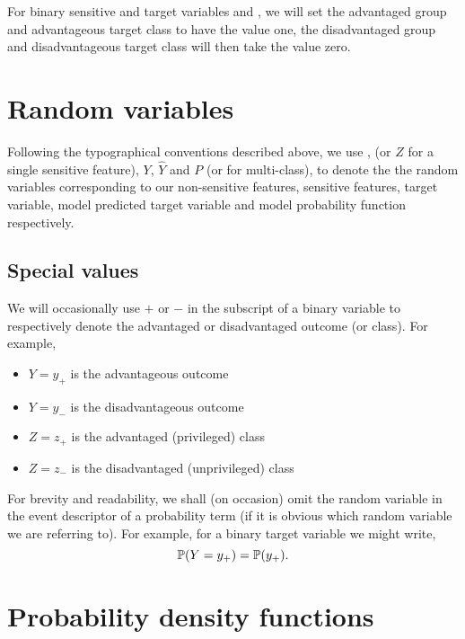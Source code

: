 For binary sensitive and target variables  and , we will set the advantaged group and advantageous target class to have the value one, the disadvantaged group and disadvantageous target class will then take the value zero.

\section*{Random variables}

Following the typographical conventions described above, we use ,  (or $Z$ for a single sensitive feature), $Y$, $\hat{Y}$ and $P$ (or  for multi-class), to denote the the random variables corresponding to our non-sensitive features, sensitive features, target variable, model predicted target variable and model probability function respectively.

\subsection*{Special values}

We will occasionally use $+$ or $-$ in the subscript of a binary variable to respectively denote the advantaged or disadvantaged outcome (or class). For example,
\begin{itemize}
\item $Y = y_+$ is the advantageous outcome
\item $Y = y_-$ is the disadvantageous outcome
\item $Z = z_+$ is the advantaged (privileged) class
\item $Z = z_-$ is the disadvantaged (unprivileged) class
\end{itemize}

For brevity and readability, we shall (on occasion) omit the random variable in the event descriptor of a probability term (if it is obvious which random variable we are referring to). For example, for a binary target variable we might write,
\[
\mathbb{P}(Y=y_+) = \mathbb{P}(y_+).
\]

\section*{Probability density functions}

